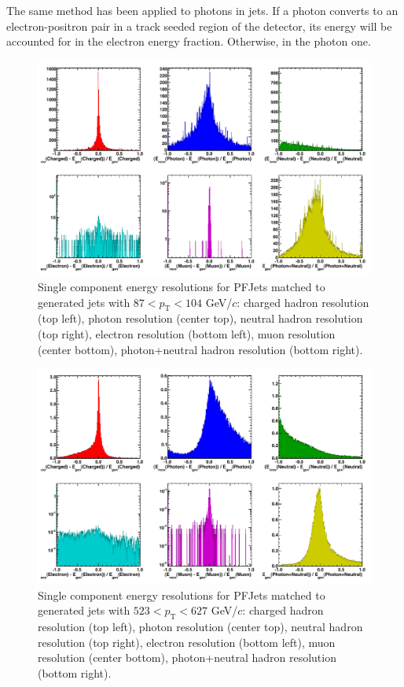 \documentclass{cmspaper}
\begin{document}
The same method has been applied to photons in jets. If a photon converts to an electron-positron pair in a track seeded region of the detector, its energy will be accounted for in the electron energy fraction. Otherwise, in the photon one.


\begin{figure}[b]
\centering
\includegraphics[width=15cm]{compreso_87_104.pdf}
\caption{Single component energy resolutions for PFJets matched to generated jets with $87<p_{\mathrm{T}} < 104$ GeV/$c$: charged hadron resolution (top left), photon resolution (center top), neutral hadron resolution (top right), electron resolution (bottom left), muon resolution (center bottom), photon+neutral hadron resolution (bottom right). \label{fig:Ex_resolutions_lowPt}}
\end{figure}
\clearpage

\begin{figure}[p]
\centering
\includegraphics[width=15cm]{compreso_523_627.pdf}
\caption{Single component energy resolutions for PFJets matched to generated jets with $523<p_{\mathrm{T}} < 627$ GeV/$c$: charged hadron resolution (top left), photon resolution (center top), neutral hadron resolution (top right), electron resolution (bottom left), muon resolution (center bottom), photon+neutral hadron resolution (bottom right). \label{fig:Ex_resolutions_highPt}}
\end{figure}
\end{document}
